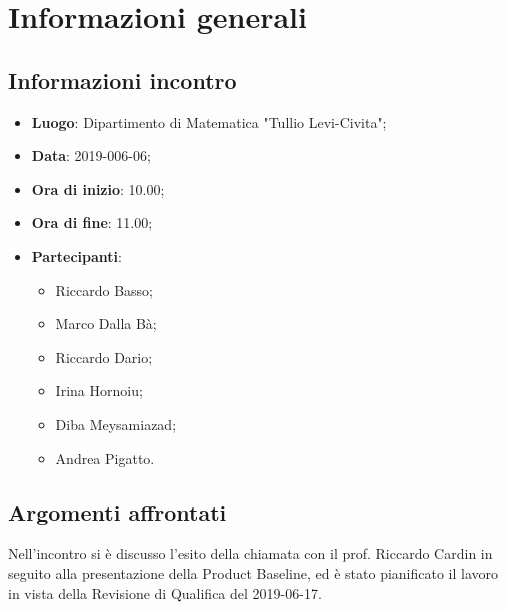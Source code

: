 \section{Informazioni generali}

\subsection{Informazioni incontro}
\begin{itemize}
	\item \textbf{Luogo}: Dipartimento di Matematica "Tullio Levi-Civita";
	\item \textbf{Data}: 2019-006-06;
	\item \textbf{Ora di inizio}: 10.00;
	\item \textbf{Ora di fine}: 11.00;
	\item \textbf{Partecipanti}: 
	\begin{itemize}
		\item Riccardo Basso;
		\item Marco Dalla Bà;
		\item Riccardo Dario;
		\item Irina Hornoiu;
		\item Diba Meysamiazad;
		\item Andrea Pigatto.	
	\end{itemize}
\end{itemize}

\subsection{Argomenti affrontati}
Nell'incontro si è discusso l'esito della chiamata con il prof. Riccardo Cardin in seguito alla presentazione della Product Baseline\glo, ed è stato pianificato il lavoro in vista della Revisione di Qualifica del 2019-06-17.

